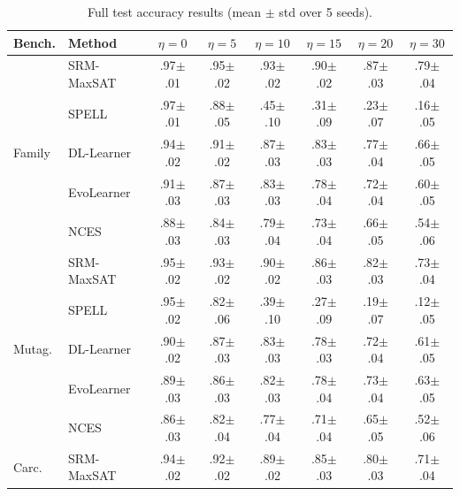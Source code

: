 \documentclass[accepted]{uai2026} %
\theoremstyle{definition}
\theoremstyle{remark}
\begin{document}
\begin{table}[ht]
  \centering
  \caption{Full test accuracy results
  (mean $\pm$ std over 5 seeds).}\label{tab:full-results}
  \small
  \setlength{\tabcolsep}{3pt}
  \begin{tabular}{@{}llcccccc@{}}
    \toprule
    \textbf{Bench.} & \textbf{Method}
      & $\eta{=}0$ & $\eta{=}5$ & $\eta{=}10$
      & $\eta{=}15$ & $\eta{=}20$ & $\eta{=}30$ \\
    \midrule
    \multirow{5}{*}{Family}
    & SRM-MaxSAT & .97\tiny$\pm$.01 & .95\tiny$\pm$.02
      & .93\tiny$\pm$.02 & .90\tiny$\pm$.02
      & .87\tiny$\pm$.03 & .79\tiny$\pm$.04 \\
    & SPELL & .97\tiny$\pm$.01 & .88\tiny$\pm$.05
      & .45\tiny$\pm$.10 & .31\tiny$\pm$.09
      & .23\tiny$\pm$.07 & .16\tiny$\pm$.05 \\
    & DL-Learner & .94\tiny$\pm$.02 & .91\tiny$\pm$.02
      & .87\tiny$\pm$.03 & .83\tiny$\pm$.03
      & .77\tiny$\pm$.04 & .66\tiny$\pm$.05 \\
    & EvoLearner & .91\tiny$\pm$.03 & .87\tiny$\pm$.03
      & .83\tiny$\pm$.03 & .78\tiny$\pm$.04
      & .72\tiny$\pm$.04 & .60\tiny$\pm$.05 \\
    & NCES & .88\tiny$\pm$.03 & .84\tiny$\pm$.03
      & .79\tiny$\pm$.04 & .73\tiny$\pm$.04
      & .66\tiny$\pm$.05 & .54\tiny$\pm$.06 \\
    \midrule
    \multirow{5}{*}{Mutag.}
    & SRM-MaxSAT & .95\tiny$\pm$.02 & .93\tiny$\pm$.02
      & .90\tiny$\pm$.02 & .86\tiny$\pm$.03
      & .82\tiny$\pm$.03 & .73\tiny$\pm$.04 \\
    & SPELL & .95\tiny$\pm$.02 & .82\tiny$\pm$.06
      & .39\tiny$\pm$.10 & .27\tiny$\pm$.09
      & .19\tiny$\pm$.07 & .12\tiny$\pm$.05 \\
    & DL-Learner & .90\tiny$\pm$.02 & .87\tiny$\pm$.03
      & .83\tiny$\pm$.03 & .78\tiny$\pm$.03
      & .72\tiny$\pm$.04 & .61\tiny$\pm$.05 \\
    & EvoLearner & .89\tiny$\pm$.03 & .86\tiny$\pm$.03
      & .82\tiny$\pm$.03 & .78\tiny$\pm$.04
      & .73\tiny$\pm$.04 & .63\tiny$\pm$.05 \\
    & NCES & .86\tiny$\pm$.03 & .82\tiny$\pm$.04
      & .77\tiny$\pm$.04 & .71\tiny$\pm$.04
      & .65\tiny$\pm$.05 & .52\tiny$\pm$.06 \\
    \midrule
    \multirow{5}{*}{Carc.}
    & SRM-MaxSAT & .94\tiny$\pm$.02 & .92\tiny$\pm$.02
      & .89\tiny$\pm$.02 & .85\tiny$\pm$.03
      & .80\tiny$\pm$.03 & .71\tiny$\pm$.04 \\

\end{tabular}
\end{table}
\end{document}
